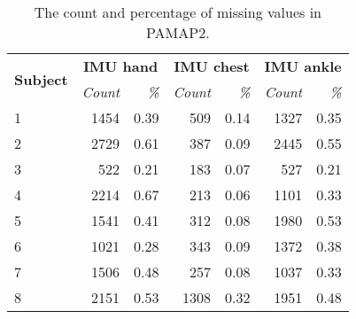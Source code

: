 \documentclass{sigchi}
\def\plaintitle{}
\def\plainkeywords{Authors' choice; of terms; separated; by
  semicolons; include commas, within terms only; required.}
\begin{document}
\title{\plaintitle}


\maketitle

%
%
\begin{table}[t]
    \centering
    \begin{tabular}{lrrrrrr}\toprule
        \multirow{2}{*}{\textbf{Subject}} & \multicolumn{2}{c}{\textbf{IMU hand}} & \multicolumn{2}{c}{\textbf{IMU chest}} & \multicolumn{2}{c}{\textbf{IMU ankle}}\\
        \cmidrule(r){2-3} \cmidrule(r){4-5} \cmidrule(r){6-7}
        & \emph{Count} & \emph{\%} & \emph{Count} & \emph{\%} & \emph{Count} & \emph{\%} \\ \midrule
        1 & 1454 & 0.39 & 509  & 0.14 & 1327 & 0.35 \\
        2 & 2729 & 0.61 & 387  & 0.09 & 2445 & 0.55 \\
        3 & 522  & 0.21 & 183  & 0.07 & 527  & 0.21 \\
        4 & 2214 & 0.67 & 213  & 0.06 & 1101 & 0.33 \\
        5 & 1541 & 0.41 & 312  & 0.08 & 1980 & 0.53 \\
        6 & 1021 & 0.28 & 343  & 0.09 & 1372 & 0.38 \\
        7 & 1506 & 0.48 & 257  & 0.08 & 1037 & 0.33 \\
        8 & 2151 & 0.53 & 1308 & 0.32 & 1951 & 0.48 \\ \bottomrule
    \end{tabular}
    \caption{The count and percentage of missing values in PAMAP2.}~\label{NA_PAMAP2}
\end{table}
\end{document}
